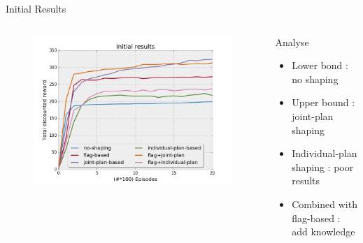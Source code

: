 \documentclass{bredelebeamer}
\begin{document}
\begin{frame}{Initial Results}

\begin{columns}

\begin{column}{0.65\linewidth}

\begin{figure}[h!]
  \includegraphics[width = \linewidth]{../article/img/initial.png}
  \label{fig:results1}
\end{figure}

\end{column}


\begin{column}{0.45\linewidth}

\begin{block}{Analyse}
\begin{itemize}
\item Lower bond : no shaping
\item Upper bound : joint-plan shaping
\item Individual-plan shaping : poor results
\item Combined with flag-based : add knowledge
\end{itemize}
\end{block}

\end{column}

\end{columns}

\end{frame}
\end{document}
